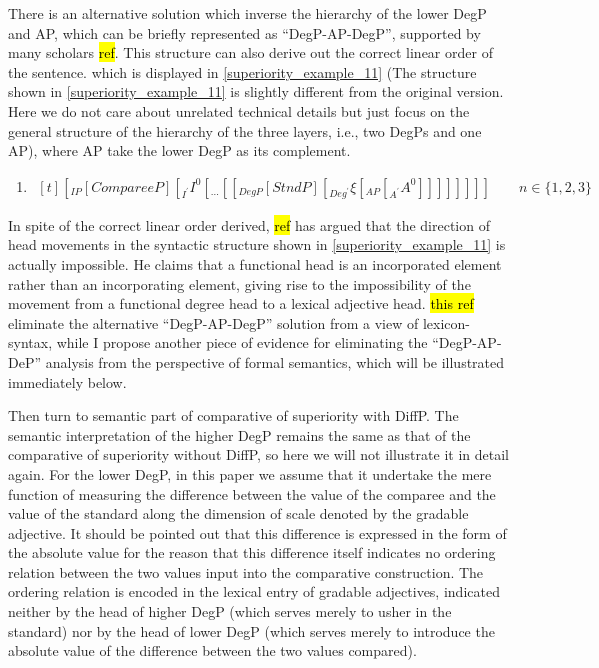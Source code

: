 \documentclass{ctexart}
\begin{document}
There is an alternative solution which inverse the hierarchy of the lower DegP and AP, which can be briefly represented as ``DegP-AP-DegP'', supported by many scholars \hl{ref}. This structure can also derive out the correct linear order of the sentence. which is displayed in \ref{superiority_example_11} (The structure shown in \ref{superiority_example_11} is slightly different from the original version. Here we do not care about unrelated technical details but just focus on the general structure of the hierarchy of the three layers, i.e., two DegPs and one AP), where AP take the lower DegP as its complement.

\begin{enumerate}
    \item \label{superiority_example_11}
    $\begin{aligned}[t]
        [_{IP} [CompareeP] [_{I^{\prime}} I^{0} [_{...} [[_{DegP} [StndP] [_{Deg^{\prime}} \xi [_{AP} [_{A^{\prime}} A^{0}]]]]]]]] \qquad n \in \{1, 2, 3\}
    \end{aligned}$
\end{enumerate}

In spite of the correct linear order derived, \hl{ref} has argued that the direction of head movements in the syntactic structure shown in \ref{superiority_example_11} is actually impossible. He claims that a functional head is an incorporated element rather than an incorporating element, giving rise to the impossibility of the movement from a functional degree head to a lexical adjective head. \hl{this ref} eliminate the alternative ``DegP-AP-DegP'' solution from a view of lexicon-syntax, while I propose another piece of evidence for eliminating the ``DegP-AP-DeP'' analysis from the perspective of formal semantics, which will be illustrated immediately below.

Then turn to semantic part of comparative of superiority with DiffP. The semantic interpretation of the higher DegP remains the same as that of the comparative of superiority without DiffP, so here we will not illustrate it in detail again. For the lower DegP, in this paper we assume that it undertake the mere function of measuring the difference between the value of the comparee and the value of  the standard along the dimension of scale denoted by the gradable adjective. It should be pointed out that this difference is expressed in the form of the absolute value for the reason that this difference itself indicates no ordering relation between the two values input into the comparative construction.  The ordering relation is encoded in the lexical entry of gradable adjectives,  indicated neither by the head of higher DegP (which serves merely to usher in the standard) nor by the head of lower DegP (which serves merely to introduce the absolute value of the difference between the two values compared). 
\end{document}
